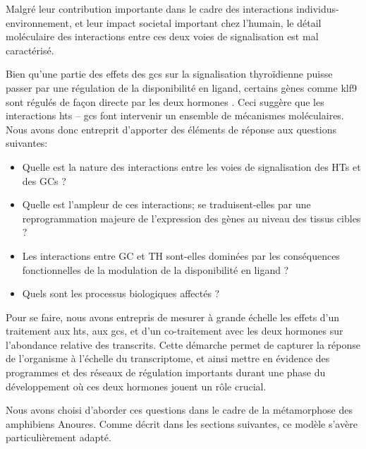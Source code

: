 \documentclass[../main.tex]{subfiles}
\begin{document}
Malgré leur contribution importante dans le cadre des interactions individus-environnement, et leur impact societal important chez l'humain, le détail moléculaire des interactions entre ces deux voies de signalisation est mal caractérisé.
\par
Bien qu'une partie des effets des \glspl{gc} sur la signalisation thyroïdienne puisse passer par une régulation de la disponibilité en ligand, certains gènes comme \gls{klf9} sont régulés de façon directe par les deux hormones \citep{Denver2009b,Bagamasbad2012}.
Ceci suggère que les interactions \glspl{ht} – \glspl{gc} font intervenir un ensemble de mécanismes moléculaires. 
Nous avons donc entreprit d'apporter des éléments de réponse aux questions suivantes:
\begin{itemize}
\item Quelle est la nature des interactions entre les voies de signalisation des HTs et des GCs ? 
\item Quelle est l'ampleur de ces interactions; se traduisent-elles par une reprogrammation majeure de l'expression des gènes au niveau des tissus cibles ?
\item Les interactions entre GC et TH sont-elles dominées par les conséquences fonctionnelles de la modulation de la disponibilité en ligand ?
\item Quels sont les processus biologiques affectés ?
\end{itemize}
Pour se faire, nous avons entrepris de mesurer à grande échelle les effets d'un traitement aux \glspl{ht}, aux \glspl{gc}, et d'un co-traitement avec les deux hormones sur l'abondance relative des transcrits.
Cette démarche permet de capturer la réponse de l'organisme à l'échelle du transcriptome, et ainsi mettre en évidence des programmes et des réseaux de régulation importants durant une phase du développement où ces deux hormones jouent un rôle crucial.
\par
Nous avons choisi d'aborder ces questions dans le cadre de la métamorphose des amphibiens Anoures.
Comme décrit dans les sections suivantes, ce modèle s'avère particulièrement adapté.



\end{document}

